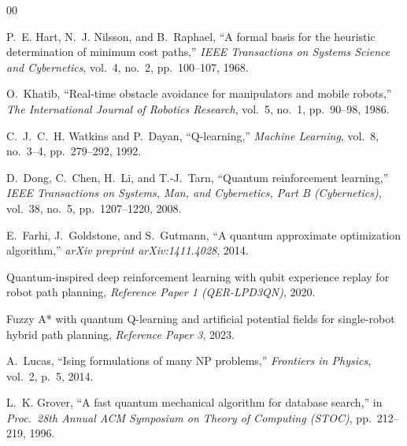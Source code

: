 \documentclass[conference]{IEEEtran}
\begin{document}
\begin{thebibliography}{00}

P.~E. Hart, N.~J. Nilsson, and B.~Raphael, ``A formal basis for the heuristic determination of minimum cost paths,'' \textit{IEEE Transactions on Systems Science and Cybernetics}, vol.~4, no.~2, pp.~100--107, 1968.

O.~Khatib, ``Real-time obstacle avoidance for manipulators and mobile robots,'' \textit{The International Journal of Robotics Research}, vol.~5, no.~1, pp.~90--98, 1986.

C.~J.~C.~H. Watkins and P.~Dayan, ``Q-learning,'' \textit{Machine Learning}, vol.~8, no.~3--4, pp.~279--292, 1992.

D.~Dong, C.~Chen, H.~Li, and T.-J.~Tarn, ``Quantum reinforcement learning,'' \textit{IEEE Transactions on Systems, Man, and Cybernetics, Part B (Cybernetics)}, vol.~38, no.~5, pp.~1207--1220, 2008.

E.~Farhi, J.~Goldstone, and S.~Gutmann, ``A quantum approximate optimization algorithm,'' \textit{arXiv preprint arXiv:1411.4028}, 2014.

Quantum-inspired deep reinforcement learning with qubit experience replay for robot path planning, \textit{Reference Paper 1 (QER-LPD3QN)}, 2020.

Fuzzy A* with quantum Q-learning and artificial potential fields for single-robot hybrid path planning, \textit{Reference Paper 3}, 2023.

A.~Lucas, ``Ising formulations of many NP problems,'' \textit{Frontiers in Physics}, vol.~2, p.~5, 2014.

L.~K. Grover, ``A fast quantum mechanical algorithm for database search,'' in \textit{Proc.\ 28th Annual ACM Symposium on Theory of Computing (STOC)}, pp.~212--219, 1996.

\end{thebibliography}
\end{document}
